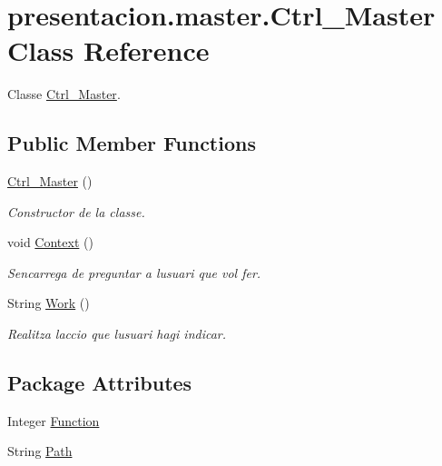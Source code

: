\hypertarget{classpresentacion_1_1master_1_1Ctrl__Master}{}\section{presentacion.\+master.\+Ctrl\+\_\+\+Master Class Reference}
\label{classpresentacion_1_1master_1_1Ctrl__Master}


Classe \hyperlink{classpresentacion_1_1master_1_1Ctrl__Master}{Ctrl\+\_\+\+Master}.  


\subsection*{Public Member Functions}
\begin{DoxyCompactItemize}
\item 
\mbox{\label{classpresentacion_1_1master_1_1Ctrl__Master_a7336c36d767f4eb13e75761b67de17c4}} 
\hyperlink{classpresentacion_1_1master_1_1Ctrl__Master_a7336c36d767f4eb13e75761b67de17c4}{Ctrl\+\_\+\+Master} ()
\begin{DoxyCompactList}\small\item\em Constructor de la classe. \end{DoxyCompactList}\item 
\mbox{\label{classpresentacion_1_1master_1_1Ctrl__Master_adf19ba4025da7654d5e7c01d9f5650c1}} 
void \hyperlink{classpresentacion_1_1master_1_1Ctrl__Master_adf19ba4025da7654d5e7c01d9f5650c1}{Context} ()
\begin{DoxyCompactList}\small\item\em S\textquotesingle{}encarrega de preguntar a l\textquotesingle{}usuari que vol fer. \end{DoxyCompactList}\item 
String \hyperlink{classpresentacion_1_1master_1_1Ctrl__Master_aa25099e202de5e076b950e4e3bf5c26b}{Work} ()
\begin{DoxyCompactList}\small\item\em Realitza l\textquotesingle{}accio que l\textquotesingle{}usuari hagi indicar. \end{DoxyCompactList}\end{DoxyCompactItemize}
\subsection*{Package Attributes}
\begin{DoxyCompactItemize}
\item 
Integer \hyperlink{classpresentacion_1_1master_1_1Ctrl__Master_a5358a65f5f7bc39f860af1d858739d41}{Function}
\item 
String \hyperlink{classpresentacion_1_1master_1_1Ctrl__Master_a3d2cb29ead7034fa79496fca2da0157a}{Path}
\end{DoxyCompactItemize}


